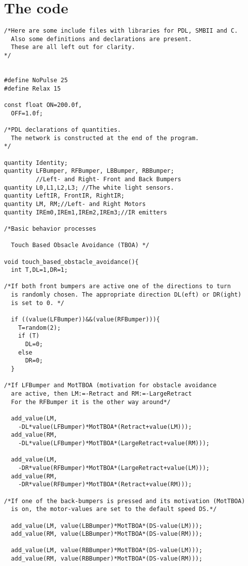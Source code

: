 \section*{The code}
{\scriptsize\begin{verbatim}
/*Here are some include files with libraries for PDL, SMBII and C.
  Also some definitions and declarations are present.
  These are all left out for clarity.
*/


#define NoPulse 25
#define Relax 15

const float ON=200.0f,
  OFF=1.0f;

/*PDL declarations of quantities. 
  The network is constructed at the end of the program.
*/

quantity Identity;
quantity LFBumper, RFBumper, LBBumper, RBBumper;
         //Left- and Right- Front and Back Bumpers
quantity L0,L1,L2,L3; //The white light sensors.
quantity LeftIR, FrontIR, RightIR;
quantity LM, RM;//Left- and Right Motors
quantity IREm0,IREm1,IREm2,IREm3;//IR emitters

/*Basic behavior processes

  Touch Based Obsacle Avoidance (TBOA) */

void touch_based_obstacle_avoidance(){
  int T,DL=1,DR=1;	
  
/*If both front bumpers are active one of the directions to turn
  is randomly chosen. The appropriate direction DL(eft) or DR(ight)
  is set to 0. */

  if ((value(LFBumper))&&(value(RFBumper))){
    T=random(2);
    if (T)
      DL=0;
    else
      DR=0;
  }

/*If LFBumper and MotTBOA (motivation for obstacle avoidance
  are active, then LM:=-Retract and RM:=-LargeRetract
  For the RFBumper it is the other way around*/

  add_value(LM, 
    -DL*value(LFBumper)*MotTBOA*(Retract+value(LM)));
  add_value(RM, 
    -DL*value(LFBumper)*MotTBOA*(LargeRetract+value(RM)));

  add_value(LM, 
    -DR*value(RFBumper)*MotTBOA*(LargeRetract+value(LM)));
  add_value(RM, 
    -DR*value(RFBumper)*MotTBOA*(Retract+value(RM)));
  
/*If one of the back-bumpers is pressed and its motivation (MotTBOA) 
  is on, the motor-values are set to the default speed DS.*/

  add_value(LM, value(LBBumper)*MotTBOA*(DS-value(LM)));
  add_value(RM, value(LBBumper)*MotTBOA*(DS-value(RM)));

  add_value(LM, value(RBBumper)*MotTBOA*(DS-value(LM)));
  add_value(RM, value(RBBumper)*MotTBOA*(DS-value(RM)));


\end{verbatim}}
